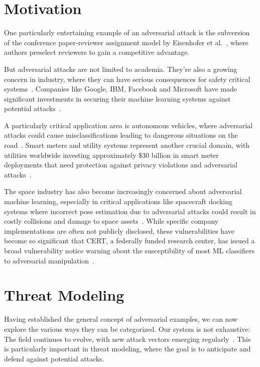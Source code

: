 \documentclass[a4paper, oneside]{discothesis}
\begin{document}
\section{Motivation}

One particularly entertaining example of an adversarial attack is the subversion of the conference paper-reviewer assignment model by Eisenhofer et al.~\cite{eisenhofer2023no}, where authors preselect reviewers to gain a competitive advantage.

But adversarial attacks are not limited to academia. They're also a growing concern in industry, where they can have serious consequences for safety critical systems~\cite{9099439, Khadka2022ResilientML, yilmaz2021privacy, apruzzese2023real, kumar2020legal, Cao2020HateGANAG, Nurseitov2022ApplicationOM, Zolotukhin2022AttacksAM}. Companies like Google, IBM, Facebook and Microsoft have made significant investments in securing their machine learning systems against potential attacks~\cite{apruzzese2023real}.

A particularly critical application area is autonomous vehicles, where adversarial attacks could cause misclassifications leading to dangerous situations on the road~\cite{9099439}. Smart meters and utility systems represent another crucial domain, with utilities worldwide investing approximately \$30 billion in smart meter deployments that need protection against privacy violations and adversarial attacks~\cite{yilmaz2021privacy}.

The space industry has also become increasingly concerned about adversarial machine learning, especially in critical applications like spacecraft docking systems where incorrect pose estimation due to adversarial attacks could result in costly collisions and damage to space assets~\cite{Khadka2022ResilientML}. While specific company implementations are often not publicly disclosed, these vulnerabilities have become so significant that CERT, a federally funded research center, has issued a broad vulnerability notice warning about the susceptibility of most ML classifiers to adversarial manipulation~\cite{apruzzese2023real}.

\section{Threat Modeling}

Having established the general concept of adversarial examples, we can now explore the various ways they can be categorized. Our system is not exhaustive: The field continues to evolve, with new attack vectors emerging regularly~\cite{Khaleel2024AdversarialAI}. This is particularly important in threat modeling, where the goal is to anticipate and defend against potential attacks.
\end{document}
